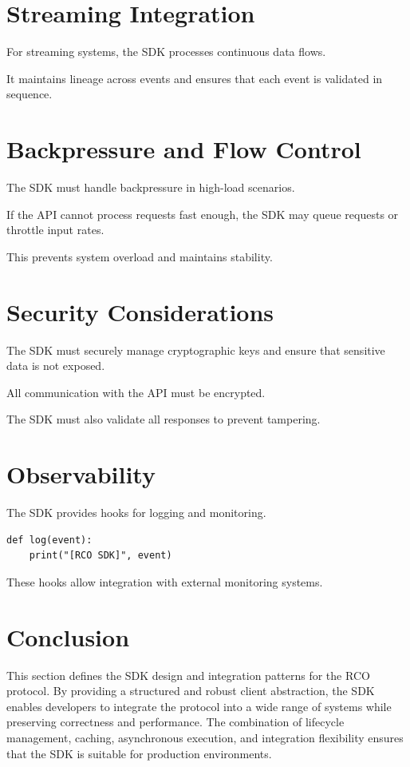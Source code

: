 \section{Streaming Integration}

For streaming systems, the SDK processes continuous data flows.

It maintains lineage across events and ensures that each event is validated in sequence.

\section{Backpressure and Flow Control}

The SDK must handle backpressure in high-load scenarios.

If the API cannot process requests fast enough, the SDK may queue requests or throttle input rates.

This prevents system overload and maintains stability.

\section{Security Considerations}

The SDK must securely manage cryptographic keys and ensure that sensitive data is not exposed.

All communication with the API must be encrypted.

The SDK must also validate all responses to prevent tampering.

\section{Observability}

The SDK provides hooks for logging and monitoring.

\begin{verbatim}
def log(event):
    print("[RCO SDK]", event)
\end{verbatim}

These hooks allow integration with external monitoring systems.

\section{Conclusion}

This section defines the SDK design and integration patterns for the RCO protocol. By providing a structured and robust client abstraction, the SDK enables developers to integrate the protocol into a wide range of systems while preserving correctness and performance. The combination of lifecycle management, caching, asynchronous execution, and integration flexibility ensures that the SDK is suitable for production environments.

